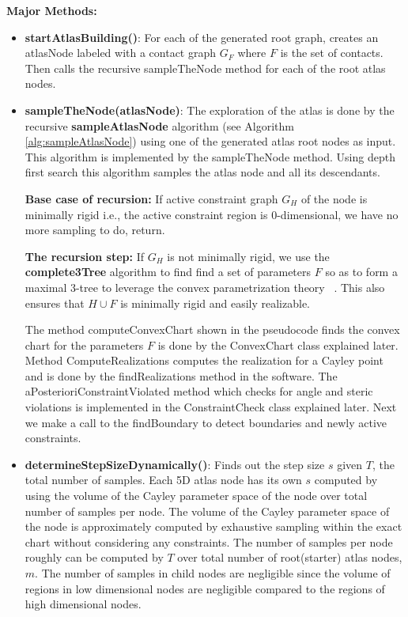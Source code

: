 \noindent \textbf{Major Methods:}
\begin{itemize}
		\item  \textbf{startAtlasBuilding()}: For each of the generated root graph, 
				creates an atlasNode labeled with a contact graph $G_F$ where $F$ is the
				set of contacts. Then calls the recursive sampleTheNode method 
				for each of the root atlas nodes.
		\item  \textbf{sampleTheNode(atlasNode)}: The exploration of the atlas
				is done by the recursive \textbf{sampleAtlasNode} algorithm (see Algorithm 
				\ref{alg:sampleAtlasNode})
				using one of the generated atlas root nodes as input. This
				algorithm is implemented by the sampleTheNode method. Using
				depth first search this algorithm samples the atlas node and
				all its descendants. 
				
				\textbf{Base case of recursion:} If active constraint graph $G_H$ of the 
				node is minimally rigid i.e., the active constraint region is 
				0-dimensional, we have no more sampling to do, return.
				
				\textbf{The recursion step:} If $G_H$ is not minimally rigid, we use the
				\textbf{complete3Tree} algorithm to find find a set of parameters $F$ so 
				as to form a maximal 3-tree to leverage the convex parametrization theory~
				\cite{SiGa:2010}. This also ensures that $H \cup F$ is minimally rigid and 
				easily realizable. 
				
				The method computeConvexChart shown in the pseudocode finds the convex 
				chart for the parameters $F$ is done by the ConvexChart class explained 
				later. Method ComputeRealizations computes the realization for a 
				Cayley point and is done by the findRealizations method in the software. 
				The aPosterioriConstraintViolated method which checks for angle and steric 
				violations is implemented in the ConstraintCheck class explained later.
				Next we make a call to the findBoundary to detect boundaries and
				newly active constraints.
				

		\item  \textbf{determineStepSizeDynamically()}: Finds out the step size $s$
				given $T$, the total number of samples. Each 5D atlas node has its
				own $s$ computed by using the volume of the Cayley parameter space of the
				node over total number of samples per node. The volume of the
				Cayley parameter space of the node is approximately computed by
				exhaustive sampling within the exact chart without considering
				any constraints. The number of samples per node roughly can be
				computed by $T$ over total number of root(starter) atlas
				nodes, $m$. The number of samples in child nodes are negligible
				since the volume of regions in low dimensional nodes are
				negligible compared to the regions of high dimensional nodes.
		

\end{itemize}
